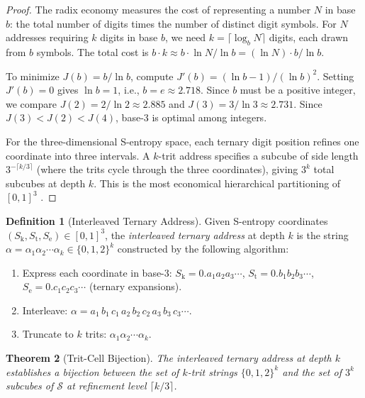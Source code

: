 \documentclass[11pt,twocolumn,a4paper]{article}
\newtheorem{theorem}{Theorem}[section]
\theoremstyle{definition}
\newtheorem{definition}[theorem]{Definition}
\theoremstyle{remark}
\newcommand{\Sk}{S_{\mathrm{k}}}
\newcommand{\St}{S_{\mathrm{t}}}
\newcommand{\Se}{S_{\mathrm{e}}}
\newcommand{\Sspace}{\mathcal{S}}
\begin{document}
\begin{proof}
The radix economy measures the cost of representing a number $N$ in base $b$: the total number of digits times the number of distinct digit symbols. For $N$ addresses requiring $k$ digits in base $b$, we need $k = \lceil \log_b N \rceil$ digits, each drawn from $b$ symbols. The total cost is $b \cdot k \approx b \cdot \ln N / \ln b = (\ln N) \cdot b / \ln b$.

To minimize $J(b) = b / \ln b$, compute $J'(b) = (\ln b - 1)/(\ln b)^2$. Setting $J'(b) = 0$ gives $\ln b = 1$, i.e., $b = e \approx 2.718$. Since $b$ must be a positive integer, we compare $J(2) = 2/\ln 2 \approx 2.885$ and $J(3) = 3/\ln 3 \approx 2.731$. Since $J(3) < J(2) < J(4)$, base-3 is optimal among integers.

For the three-dimensional S-entropy space, each ternary digit position refines one coordinate into three intervals. A $k$-trit address specifies a subcube of side length $3^{-\lceil k/3 \rceil}$ (where the trits cycle through the three coordinates), giving $3^k$ total subcubes at depth $k$. This is the most economical hierarchical partitioning of $[0,1]^3$ \citep{brusentsov1962,knuth1998}.
\end{proof}

\begin{definition}[Interleaved Ternary Address]\label{def:ternary-address}
Given S-entropy coordinates $(\Sk, \St, \Se) \in [0,1]^3$, the \emph{interleaved ternary address} at depth $k$ is the string $\alpha = \alpha_1 \alpha_2 \cdots \alpha_k \in \{0, 1, 2\}^k$ constructed by the following algorithm:

\begin{enumerate}[label=\textbf{Step \arabic*:}]
  \item Express each coordinate in base-3: $\Sk = 0.a_1 a_2 a_3 \cdots$, $\St = 0.b_1 b_2 b_3 \cdots$, $\Se = 0.c_1 c_2 c_3 \cdots$ (ternary expansions).
  \item Interleave: $\alpha = a_1\, b_1\, c_1\, a_2\, b_2\, c_2\, a_3\, b_3\, c_3 \cdots$.
  \item Truncate to $k$ trits: $\alpha_1 \alpha_2 \cdots \alpha_k$.
\end{enumerate}
\end{definition}

\begin{theorem}[Trit-Cell Bijection]\label{thm:trit-cell}
The interleaved ternary address at depth $k$ establishes a bijection between the set of $k$-trit strings $\{0, 1, 2\}^k$ and the set of $3^k$ subcubes of $\Sspace$ at refinement level $\lceil k/3 \rceil$.
\end{theorem}
\end{document}
